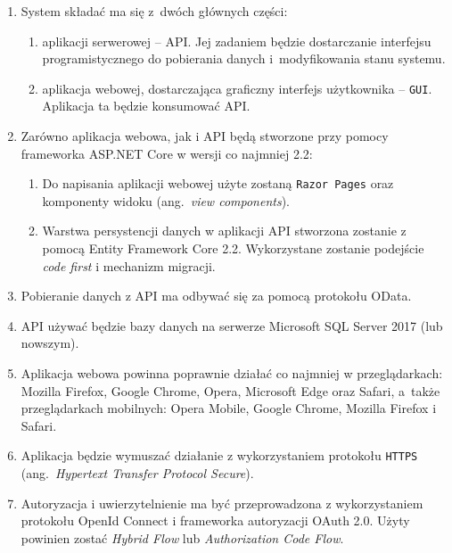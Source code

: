 \begin{enumerate}[labelwidth=\widthof{\ref{last-item}},label=\arabic*.]

\item System składać ma się z~dwóch głównych części:
\begin{enumerate}[label=\alph*)]
\item aplikacji serwerowej -- API. Jej zadaniem będzie dostarczanie interfejsu programistycznego do pobierania danych i~modyfikowania stanu systemu.
\item aplikacja webowej, dostarczająca graficzny interfejs użytkownika -- \texttt{GUI}. Aplikacja ta będzie konsumować API.
\end{enumerate}

\item Zarówno aplikacja webowa, jak i API będą stworzone przy pomocy frameworka ASP.NET Core w wersji co najmniej 2.2: 
\begin{enumerate}[label=\alph*)]
\item Do napisania aplikacji webowej użyte zostaną \texttt{Razor Pages} oraz komponenty widoku (ang.~\emph{view components}). 
\item Warstwa persystencji danych w aplikacji API stworzona zostanie z pomocą Entity Framework Core 2.2. Wykorzystane zostanie podejście \emph{code first} i mechanizm migracji.
\end{enumerate}

\item Pobieranie danych z API ma odbywać się za pomocą protokołu OData.

\item API używać będzie bazy danych na serwerze Microsoft SQL Server 2017 (lub nowszym).

\item Aplikacja webowa powinna poprawnie działać co najmniej w przeglądarkach: Mozilla Firefox, Google Chrome, Opera, Microsoft Edge oraz Safari, a~także przeglądarkach mobilnych: Opera Mobile, Google Chrome, Mozilla Firefox i Safari.

\item Aplikacja będzie wymuszać działanie z wykorzystaniem protokołu \texttt{HTTPS} (ang.~\emph{Hypertext Transfer Protocol Secure}).

\item Autoryzacja i uwierzytelnienie ma być przeprowadzona z wykorzystaniem protokołu OpenId Connect i frameworka autoryzacji OAuth 2.0. Użyty powinien zostać \emph{Hybrid Flow} lub \emph{Authorization Code Flow}.


\end{enumerate}
